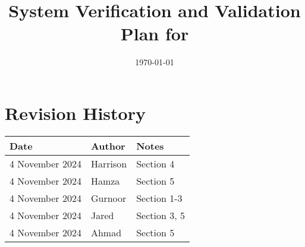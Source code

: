 \documentclass[12pt, titlepage]{article}
\begin{document}
\title{System Verification and Validation Plan for \progname{}}
\author{\authname}
\date{\today}

\maketitle


\section*{Revision History}

\begin{tabularx}{\textwidth}{p{6cm}p{2cm}X}
  \toprule {\bf Date} & {\bf Author} & {\bf Notes}\\
  \midrule
  4 November 2024 & Harrison & Section 4 \\
  4 November 2024 & Hamza & Section 5 \\
  4 November 2024 & Gurnoor & Section 1-3 \\
  4 November 2024 & Jared & Section 3, 5 \\
  4 November 2024 & Ahmad & Section 5 \\
  \bottomrule
\end{tabularx}

~\\


\newpage

\tableofcontents

\listoftables

\newpage
\end{document}
